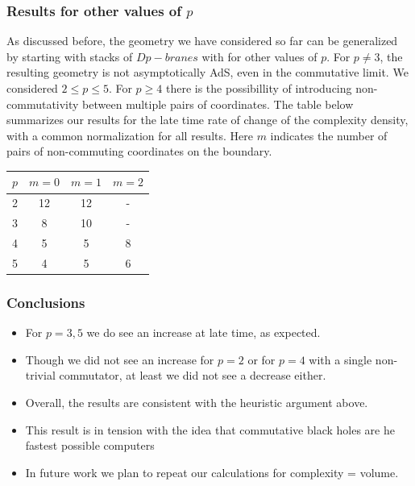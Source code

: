 \documentclass[8pt,aspectratio=169]{beamer}
\begin{document}
\begin{frame}
\frametitle{Results for other values of $p$}

As discussed before, the geometry we have considered so far can be generalized by starting with stacks of $Dp-branes$ with for other values of $p$. For $p\neq 3$, the resulting geometry is not asymptotically AdS, even in the commutative limit. We considered $2\leq p \leq 5$. For $p\geq 4$ there is the possibillity of introducing non-commutativity between multiple pairs of coordinates. The table below summarizes our results for the late time rate of change of the complexity density, with a common normalization for all results. Here $m$ indicates the number of pairs of non-commuting coordinates on the boundary.   

\begin{table}
    \centering
    \begin{tabular}{l | c  c  c }
        $p$ & $m=0$ & $m=1$ & $m=2$ \\
        \hline
        2 & 12 & 12 & - \\
        3 & 8 & 10 & - \\
        4 & 5 & 5 & 8 \\
        5 & 4 & 5 & 6 \\
    \end{tabular}
\end{table}

\end{frame}

\begin{frame}
\frametitle{Conclusions}

\begin{itemize}

\item For $p=3,5$ we do see an increase at late time, as expected.

\item Though we did not see an increase for $p=2$ or for $p=4$ with a single non-trivial commutator, at least we did not see a decrease either.

\item Overall, the results are consistent with the heuristic argument above.

\item This result is in tension with the idea that commutative black holes are he fastest possible computers

\item In future work we plan to repeat our calculations for complexity = volume.

\end{itemize}

\end{frame}
\end{document}
